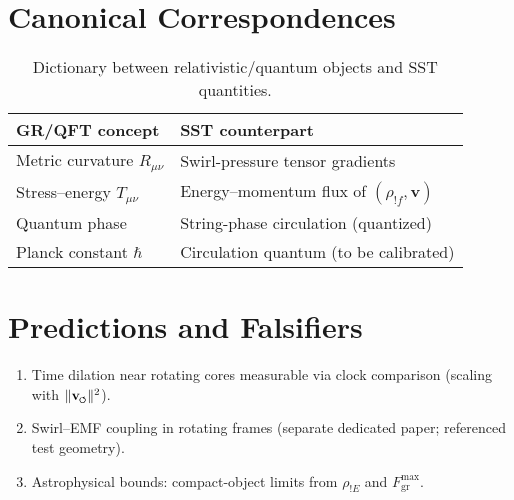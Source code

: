 \documentclass[11pt,a4paper]{article}
\newcommand{\swirlarrow}{\mathchoice{\mkern-2mu\scriptstyle\boldsymbol{\circlearrowleft}}{\mkern-2mu\scriptstyle\boldsymbol{\circlearrowleft}}{\mkern-2mu\scriptscriptstyle\boldsymbol{\circlearrowleft}}{\mkern-2mu\scriptscriptstyle\boldsymbol{\circlearrowleft}}}
\newcommand{\vswirl}{\mathbf{v}_{\swirlarrow}} %
\newcommand{\vnorm}{\lVert \vswirl \rVert}               %
\newcommand{\rhoF}{\rho_{!f}}                            %
\newcommand{\rhoE}{\rho_{!E}}                            %
\newcommand{\FmaxGr}{F_{\text{gr}}^{\max}}
\begin{document}
\section{Canonical Correspondences}

\label{sec:dictionary}

\begin{table}[h]

\centering

\caption{Dictionary between relativistic/quantum objects and SST quantities.}

\begin{tabular}{@{}ll@{}}
\toprule
GR/QFT concept & SST counterpart \\
\midrule
Metric curvature $R_{\mu\nu}$ & Swirl-pressure tensor gradients \\
Stress--energy $T_{\mu\nu}$ & Energy--momentum flux of $(\rhoF,\mathbf v)$ \\
Quantum phase & String-phase circulation (quantized) \\
Planck constant $\hbar$ & Circulation quantum (to be calibrated) \\
\bottomrule
\end{tabular}

\end{table}



\section{Predictions and Falsifiers}

\label{sec:predictions}

\begin{enumerate}[leftmargin=2.5em]

\item Time dilation near rotating cores measurable via clock comparison (scaling with $\vnorm^2$).

\item Swirl--EMF coupling in rotating frames (separate dedicated paper; referenced test geometry).

\item Astrophysical bounds: compact-object limits from $\rhoE$ and $\FmaxGr$.

\end{enumerate}


\end{document}
